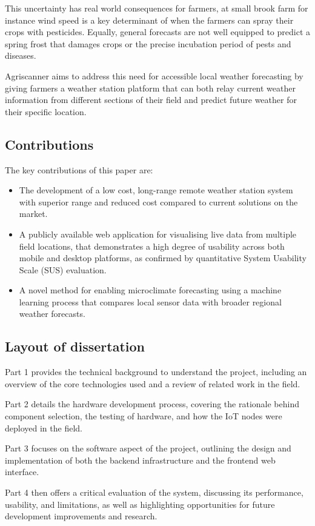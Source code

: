 This uncertainty has real world consequences for farmers, at small brook farm
for instance wind speed is a key determinant of when the farmers can spray their
crops with pesticides. Equally, general forecasts are not well equipped to
predict a spring frost that damages crops or the precise incubation period of
pests and diseases.

Agriscanner aims to address this need for accessible local weather forecasting
by giving farmers a weather station platform that can both relay current weather
information from different sections of their field and predict future weather
for their specific location. 

\subsection{Contributions}

The key contributions of this paper are:

\begin{itemize}
    \item The development of a low cost, long-range remote weather station
    system with superior range and reduced cost compared to current solutions on
    the market.
    \item A publicly available web application for visualising live data from
    multiple field locations, that demonstrates a high degree of usability
    across both mobile and desktop platforms, as confirmed by quantitative
    System Usability Scale (SUS) evaluation.
    \item A novel method for enabling microclimate forecasting using a machine
    learning process that compares local sensor data with broader regional
    weather forecasts.
\end{itemize}

\subsection{Layout of dissertation}

Part 1 provides the technical background to understand the project, including an
overview of the core technologies used and a review of related work in the
field.

Part 2 details the hardware development process, covering the rationale behind
component selection, the testing of hardware, and how the IoT nodes were
deployed in the field.

Part 3 focuses on the software aspect of the project, outlining the design and
implementation of both the backend infrastructure and the frontend web
interface.

Part 4 then offers a critical evaluation of the system, discussing its
performance, usability, and limitations, as well as highlighting opportunities
for future development improvements and research. 